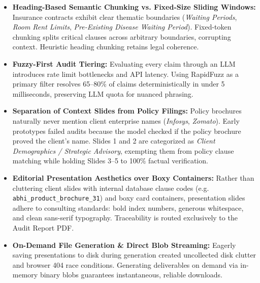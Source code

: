 \documentclass[11pt,a4paper]{article}
\begin{document}
\begin{itemize}
    \item \textbf{Heading-Based Semantic Chunking vs. Fixed-Size Sliding Windows:} Insurance contracts exhibit clear thematic boundaries (\textit{Waiting Periods}, \textit{Room Rent Limits}, \textit{Pre-Existing Disease Waiting Period}). Fixed-token chunking splits critical clauses across arbitrary boundaries, corrupting context. Heuristic heading chunking retains legal coherence.
    \item \textbf{Fuzzy-First Audit Tiering:} Evaluating every claim through an LLM introduces rate limit bottlenecks and API latency. Using RapidFuzz as a primary filter resolves 65--80\% of claims deterministically in under 5 milliseconds, preserving LLM quota for nuanced phrasing.
    \item \textbf{Separation of Context Slides from Policy Filings:} Policy brochures naturally never mention client enterprise names (\textit{Infosys}, \textit{Zomato}). Early prototypes failed audits because the model checked if the policy brochure proved the client's name. Slides 1 and 2 are categorized as \textit{Client Demographics / Strategic Advisory}, exempting them from policy clause matching while holding Slides 3--5 to 100\% factual verification.
    \item \textbf{Editorial Presentation Aesthetics over Boxy Containers:} Rather than cluttering client slides with internal database clause codes (e.g. \texttt{abhi\_product\_brochure\_31}) and boxy card containers, presentation slides adhere to consulting standards: bold index numbers, generous whitespace, and clean sans-serif typography. Traceability is routed exclusively to the Audit Report PDF.
    \item \textbf{On-Demand File Generation \& Direct Blob Streaming:} Eagerly saving presentations to disk during generation created uncollected disk clutter and browser 404 race conditions. Generating deliverables on demand via in-memory binary blobs guarantees instantaneous, reliable downloads.
\end{itemize}
\end{document}
